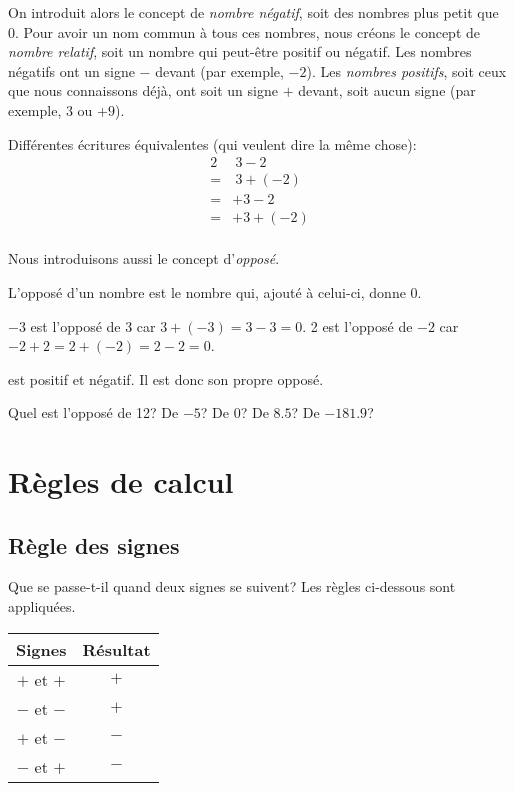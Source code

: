 \noindent On introduit alors le concept de \emph{nombre négatif}, soit des nombres plus petit que 0. Pour avoir un nom commun à tous ces nombres, nous créons le concept de \emph{nombre relatif}, soit un nombre qui peut-être positif ou négatif. Les nombres négatifs ont un signe $-$ devant (par exemple, $-2$). Les \emph{nombres positifs}, soit ceux que nous connaissons déjà, ont soit un signe $+$ devant, soit aucun signe (par exemple, 3 ou $+9$).

\begin{exemple}
	Différentes écritures équivalentes (qui veulent dire la même chose):
	\begin{alignat*}{2}
		& \ 3 - 2\\
		= &\ 3 + (-2)\\
		= & +3 - 2\\
		= & +3 + (-2)\\
	\end{alignat*}
\end{exemple}
\noindent Nous introduisons aussi le concept d'\emph{opposé}.

\begin{definition}
	L'opposé d'un nombre est le nombre qui, ajouté à celui-ci, donne 0.
\end{definition}

\begin{exemple}
	$-3$ est l'opposé de 3 car $3 + (-3) = 3 -3 = 0$. 2 est l'opposé de $-2$ car $-2 + 2 = 2 + (-2) = 2 - 2 = 0$.
\end{exemple}

 est positif et négatif. Il est donc son propre opposé.

\begin{exercice}
	Quel est l'opposé de 12? De $-5$? De 0? De $8.5$? De $-181.9$?
\end{exercice}




\section{Règles de calcul}

\subsection{Règle des signes}

Que se passe-t-il quand deux signes se suivent? Les règles ci-dessous sont appliquées.

\begin{center}
	\begin{table}[h]
		\centering
		\begin{tabular}{|c|c|}
		\hline
		\textbf{Signes} & \textbf{Résultat} \\ \hline
		$+$ et $+$ & $+$ \\ \hline
		$-$ et $-$ & $+$ \\ \hline
		$+$ et $-$ & $-$ \\ \hline
		$-$ et $+$ & $-$ \\ \hline
		\end{tabular}
		\label{reglesdessignes}
		\end{table}
\end{center}

